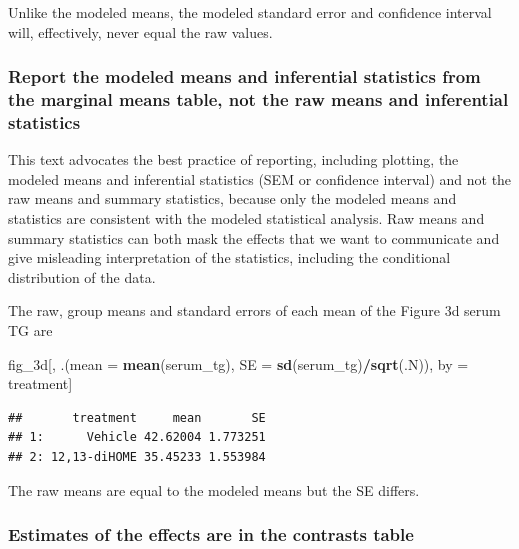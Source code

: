 \documentclass[]{book}
\newenvironment{Shaded}{\begin{snugshade}}{\end{snugshade}}
\newcommand{\DataTypeTok}[1]{\textcolor[rgb]{0.13,0.29,0.53}{#1}}
\newcommand{\KeywordTok}[1]{\textcolor[rgb]{0.13,0.29,0.53}{\textbf{#1}}}
\newcommand{\NormalTok}[1]{#1}
\newcommand{\OperatorTok}[1]{\textcolor[rgb]{0.81,0.36,0.00}{\textbf{#1}}}
\newcommand{\StringTok}[1]{\textcolor[rgb]{0.31,0.60,0.02}{#1}}
\begin{document}
Unlike the modeled means, the modeled standard error and confidence interval will, effectively, never equal the raw values.

\hypertarget{report-the-modeled-means-and-inferential-statistics-from-the-marginal-means-table-not-the-raw-means-and-inferential-statistics}{%
\subsubsection{Report the modeled means and inferential statistics from the marginal means table, not the raw means and inferential statistics}\label{report-the-modeled-means-and-inferential-statistics-from-the-marginal-means-table-not-the-raw-means-and-inferential-statistics}}

This text advocates the best practice of reporting, including plotting, the modeled means and inferential statistics (SEM or confidence interval) and not the raw means and summary statistics, because only the modeled means and statistics are consistent with the modeled statistical analysis. Raw means and summary statistics can both mask the effects that we want to communicate and give misleading interpretation of the statistics, including the conditional distribution of the data.

The raw, group means and standard errors of each mean of the Figure 3d serum TG are

\begin{Shaded}
\begin{Highlighting}[]
\NormalTok{fig_3d[, .(}\DataTypeTok{mean =} \KeywordTok{mean}\NormalTok{(serum_tg),}
           \DataTypeTok{SE =} \KeywordTok{sd}\NormalTok{(serum_tg)}\OperatorTok{/}\KeywordTok{sqrt}\NormalTok{(.N)),}
\NormalTok{       by =}\StringTok{ }\NormalTok{treatment]}
\end{Highlighting}
\end{Shaded}

\begin{verbatim}
##       treatment     mean       SE
## 1:      Vehicle 42.62004 1.773251
## 2: 12,13-diHOME 35.45233 1.553984
\end{verbatim}

The raw means are equal to the modeled means but the SE differs.

\hypertarget{estimates-of-the-effects-are-in-the-contrasts-table}{%
\subsubsection{Estimates of the effects are in the contrasts table}\label{estimates-of-the-effects-are-in-the-contrasts-table}}
\end{document}
